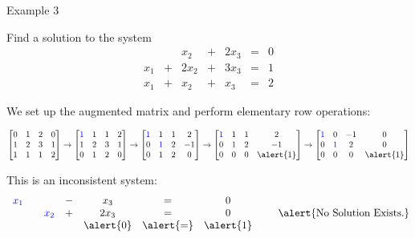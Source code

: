 \documentclass[xcolor=dvipsnames,aspectratio=169,t]{beamer}
\begin{document}
\begin{frame}{Example 3}
  
  Find a solution to the system
\[   \begin{array}{ccccccc}
     &  & x_2 & + &2 x_3&=&0\\
    x_1 & + & 2x_2 & + & 3x_3 &=& 1\\
    x_1 & + & x_2 & + & x_3 &=& 2
\end{array}  \]

\pause

\vfill

We set up the augmented matrix and perform elementary row operations:

{\small
\[ \begin{bmatrix}
  0 & 1 & 2 & 0\\
  1 & 2 & 3 & 1\\
  1 & 1 & 1 & 2
\end{bmatrix} \rightarrow
\begin{bmatrix}
 \colorb{1} & 1 & 1 & 2 \\
  1 & 2 & 3 & 1\\
   0 & 1 & 2 & 0
 \end{bmatrix}  \rightarrow
\begin{bmatrix}
 \colorb{1} & 1 & 1 & 2 \\
  0 & \colorb{1} & 2 & -1\\
   0 & 1 & 2 & 0
 \end{bmatrix}  \rightarrow
\begin{bmatrix}
 \colorb{1} & 1 & 1 & 2 \\
  0 & \colorb{1} & 2 & -1\\
   0 & 0 & 0 & \alert{1}
\end{bmatrix} \rightarrow
\begin{bmatrix}
 \colorb{1} & 0 & -1 & 0 \\
  0 & \colorb{1} & 2 & 0\\
   0 & 0 & 0 & \alert{1}
 \end{bmatrix}  \] }

  \vfill

  This is an \alert{inconsistent} system:
  \[  \begin{array}{ccccccc}
    \colorb{x_1} &  & & - & x_3&=&0\\
    &  & \colorb{x_2} & + & 2x_3 &=& 0\\
    &  &  &  & \alert{0} &\alert{=}& \alert{1}
    \end{array}  \qquad \mbox{\alert{No Solution Exists.}}\]

\end{frame}
\end{document}
